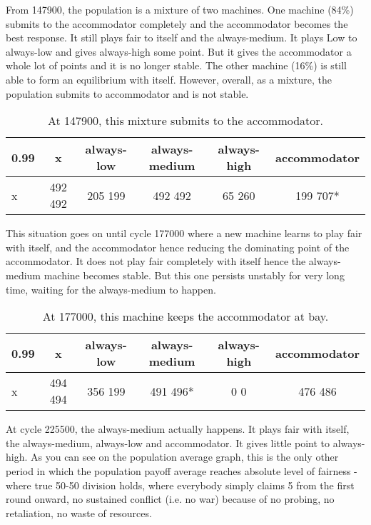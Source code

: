 \documentclass[12.5pt]{report}
\begin{document}
From 147900, the population is a mixture of two machines. One machine (84\%) submits to the accommodator completely and the accommodator becomes the best response. It still plays fair to itself and the always-medium. It plays Low to always-low and gives always-high some point. But it gives the accommodator a whole lot of points and it is no longer stable. The other machine (16\%) is still able to form an equilibrium with itself. However, overall, as a mixture, the population submits to accommodator and is not stable.

\begin{table}[h!]
\center
\begin{tabular}{l|ccccc}
\textbf{0.99}& x & always-low & always-medium & always-high & accommodator\\
\hline

x & 492 492 & 205 199  &  492 492  & 65 260  &  199 707*  \\
\end{tabular}
\caption{At 147900, this mixture submits to the accommodator.}
\end{table}

This situation goes on until cycle 177000 where a new machine learns to play fair with itself, and the accommodator hence reducing the dominating point of the accommodator. It does not play fair completely with itself hence the always-medium machine becomes stable. But this one persists unstably for very long time, waiting for the always-medium to happen.

\begin{table}[h!]
\center
\begin{tabular}{l|ccccc}
\textbf{0.99}& x & always-low & always-medium & always-high & accommodator\\
\hline

x & 494 494 & 356 199  &  491 496*  & 0 0  &  476 486  \\
\end{tabular}
\caption{At 177000, this machine keeps the accommodator at bay.}
\end{table}

At cycle 225500, the always-medium actually happens. It plays fair with itself, the always-medium, always-low and accommodator. It gives little point to always-high. As you can see on the population average graph, this is the only other period in which the population payoff average reaches absolute level of fairness - where true 50-50 division holds, where everybody simply claims 5 from the first round onward, no sustained conflict (i.e. no war) because of no probing, no retaliation, no waste of resources.
\end{document}
